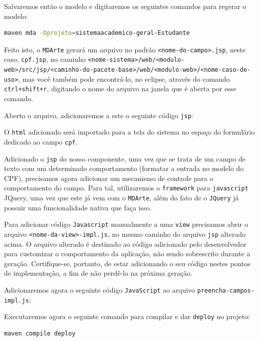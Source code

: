 Salvaremos então o modelo e digitaremos os seguintes comandos para regerar o
modelo:

\begin{lstlisting}[language=bash, frame=single, breaklines=true]
maven mda -Dprojeto=sistemaacademico-geral-Estudante
\end{lstlisting}

Feito isto, o \texttt{MDArte} gerará um arquivo no padrão
\texttt{<nome-do-campo>.jsp}, neste caso, \texttt{cpf.jsp}, no caminho
\texttt{<nome-sistema>/web/<modulo-web>/src/jsp/<caminho-do-pacote-base>/web/<modulo-web>/<nome-caso-de-uso>},
mas você também pode encontrá-lo, no eclipse, através do comando
\texttt{ctrl+shift+r}, digitando o nome do arquivo na janela que é aberta por
esse comando.

Aberto o arquivo, adicionaremos a este o seguinte código \texttt{jsp}:



O \texttt{html} adicionado será importado para a tela do sistema no espaço do
formulário dedicado ao campo \texttt{cpf}.

Adicionado o \texttt{jsp} do nosso componente, uma vez que se trata de um campo
de texto com um determinado comportamento (formatar a entrada no modelo do CPF),
precisamos agora adicionar um mecanismo de controle para o comportamento do
campo. Para tal, utilizaremos o \texttt{framework} para \texttt{javascript}
JQuery, uma vez que este já vem com o \texttt{MDArte}, além do fato de o
\texttt{JQuery} já possuir uma funcionalidade nativa que faça isso.

Para adicionar código \texttt{Javascript} manualmente a uma \texttt{view}
precisamos abrir o arquivo \texttt{<nome-da-view>-impl.js}, no mesmo caminho
do arquivo \texttt{jsp} alterado acima. O arquivo alterado é destinado ao código
adicionado pelo desenvolvedor para customizar o comportamento da aplicação, não
sendo sobrescrito durante a geração. Certifique-se, portanto, de estar
adicionando o seu código nestes pontos de implementação, a fim de não perdê-lo
na próxima geração.

Adicionaremos agora o seguinte código \texttt{JavaScript} ao arquivo
\texttt{preencha-campos-impl.js}:



Executaremos agora o seguinte comando para compilar e dar \texttt{deploy} no
projeto:
\begin{lstlisting}[language=bash, frame=single, breaklines=true]
maven compile deploy
\end{lstlisting}

